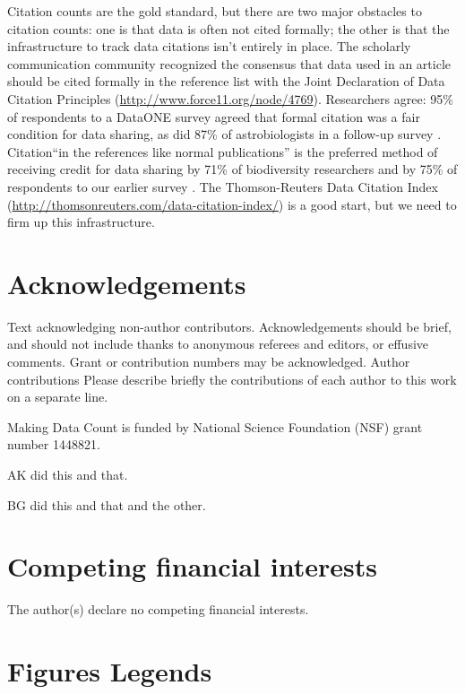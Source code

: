 \documentclass[english]{article}
\begin{document}
Citation counts are the gold standard, but there  are two major obstacles to citation counts: one is that data is often not cited formally; the other is that the infrastructure to track data citations isn't entirely in place.
The scholarly communication community recognized the consensus that data used in an article should be cited formally in the reference list with the Joint Declaration of Data Citation Principles (\url{http://www.force11.org/node/4769}). 
Researchers agree: 95\% of respondents to a DataONE survey agreed that formal citation was a fair condition for data sharing, as did 87\% of astrobiologists in a follow-up survey \cite{@tenopir_data_2011, @aydinoglu_data_2014}. 
Citation``in the references like normal publications'' is the preferred method of receiving credit for data sharing by 71\% of biodiversity researchers and by 75\% of respondents to our earlier survey \cite{@enke_users_2012, @kratz_researcher_2015}.
The Thomson-Reuters Data Citation Index (\url{http://thomsonreuters.com/data-citation-index/}) is a good start, but we need to firm up this infrastructure.


\section*{Acknowledgements}



Text acknowledging non-author contributors. Acknowledgements should
be brief, and should not include thanks to anonymous referees and
editors, or effusive comments. Grant or contribution numbers may be
acknowledged. Author contributions Please describe briefly the contributions
of each author to this work on a separate line. 

Making Data Count is funded by National Science Foundation (NSF) grant number 1448821.

AK did this and that. 

BG did this and that and the other. 


\section*{Competing financial interests}


The author(s) declare no competing financial interests.


\section*{Figures Legends}
\end{document}
